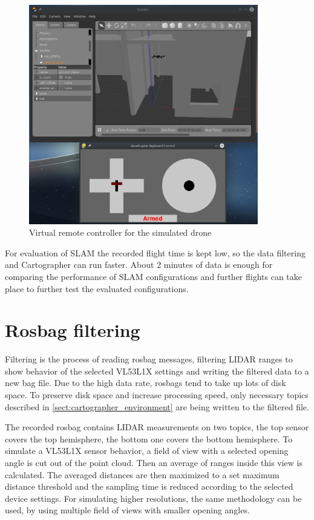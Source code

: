 \begin{figure}[!ht]
    \centering
    \includegraphics[width=100mm, keepaspectratio]{figures/fly_with_controller.png}
    \caption{Virtual remote controller for the simulated drone}
    \label{fig:remote_controller}
\end{figure}

For evaluation of SLAM the recorded flight time is kept low, so the data filtering and Cartographer 
can run faster. About 2 minutes of data is enough for comparing the performance of SLAM configurations
and further flights can take place to further test the evaluated configurations.

\section{Rosbag filtering}
Filtering is the process of reading rosbag messages, filtering LIDAR ranges to show behavior of the 
selected VL53L1X settings and writing the filtered data to a new bag file. Due to the high data rate, 
rosbags tend to take up lots of disk space. To preserve disk space and increase processing speed,
only necessary topics described in \ref{sect:cartographer_environment} are being written to the filtered file.

The recorded rosbag contains LIDAR measurements on two topics, the top sensor covers the top hemisphere,
the bottom one covers the bottom hemisphere. To simulate a VL53L1X sensor behavior, a field of view with a 
selected opening angle is cut out of the point cloud. Then an average of ranges inside this view is calculated.
The averaged distances are then maximized to a set maximum distance threshold and the sampling time is 
reduced according to the selected device settings. For simulating higher resolutions, the same methodology 
can be used, by using multiple field of views with smaller opening angles.

